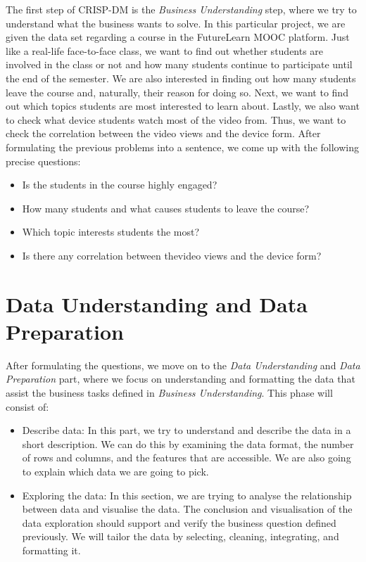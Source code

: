 \documentclass[12pt,]{article}
\providecommand{\tightlist}{%
\setlength{\itemsep}{0pt}\setlength{\parskip}{0pt}}
\begin{document}
The first step of CRISP-DM is the \emph{Business Understanding} step,
where we try to understand what the business wants to solve. In this
particular project, we are given the data set regarding a course in the
FutureLearn MOOC platform. Just like a real-life face-to-face class, we
want to find out whether students are involved in the class or not and
how many students continue to participate until the end of the semester.
We are also interested in finding out how many students leave the course
and, naturally, their reason for doing so. Next, we want to find out
which topics students are most interested to learn about. Lastly, we
also want to check what device students watch most of the video from.
Thus, we want to check the correlation between the video views and the
device form. After formulating the previous problems into a sentence, we
come up with the following precise questions:

\begin{itemize}
\tightlist
\item
  Is the students in the course highly engaged?
\item
  How many students and what causes students to leave the course?
\item
  Which topic interests students the most?
\item
  Is there any correlation between thevideo views and the device form?
\end{itemize}

\hypertarget{data-understanding-and-data-preparation}{%
\section{Data Understanding and Data
Preparation}\label{data-understanding-and-data-preparation}}

After formulating the questions, we move on to the \emph{Data
Understanding} and \emph{Data Preparation} part, where we focus on
understanding and formatting the data that assist the business tasks
defined in \emph{Business Understanding}. This phase will consist of:

\begin{itemize}
\item
  Describe data: In this part, we try to understand and describe the
  data in a short description. We can do this by examining the data
  format, the number of rows and columns, and the features that are
  accessible. We are also going to explain which data we are going to
  pick.
\item
  Exploring the data: In this section, we are trying to analyse the
  relationship between data and visualise the data. The conclusion and
  visualisation of the data exploration should support and verify the
  business question defined previously. We will tailor the data by
  selecting, cleaning, integrating, and formatting it.
\end{itemize}
\end{document}
